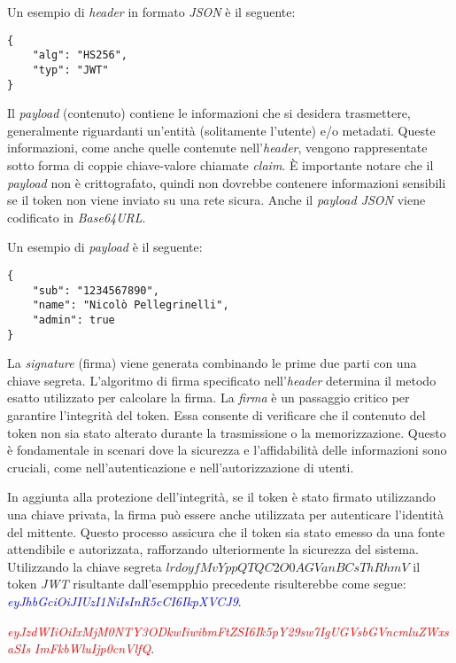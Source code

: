 \noindent Un esempio di \emph{header} in formato \emph{JSON} è il seguente:
\begin{verbatim}
{
	"alg": "HS256",
	"typ": "JWT"
}
\end{verbatim}

Il \emph{payload} (contenuto) contiene le informazioni che si desidera trasmettere, generalmente riguardanti un'entità (solitamente l'utente) e/o metadati.
Queste informazioni, come anche quelle contenute nell'\emph{header}, vengono rappresentate sotto forma di coppie chiave-valore chiamate \emph{claim}.
È importante notare che il \emph{payload} non è crittografato, quindi non dovrebbe contenere informazioni sensibili se il token non viene inviato su una rete sicura.
Anche il \emph{payload JSON} viene codificato in \emph{Base64URL}.

\noindent Un esempio di \emph{payload} è il seguente:
\begin{verbatim}
{
	"sub": "1234567890",
	"name": "Nicolò Pellegrinelli",
	"admin": true
}
\end{verbatim}

La \emph{signature} (firma) viene generata combinando le prime due parti con una chiave segreta.
L'algoritmo di firma specificato nell'\emph{header} determina il metodo esatto utilizzato per calcolare la firma.
La \emph{firma} è un passaggio critico per garantire l'integrità del token.
Essa consente di verificare che il contenuto del token non sia stato alterato durante la trasmissione o la memorizzazione.
Questo è fondamentale in scenari dove la sicurezza e l'affidabilità delle informazioni sono cruciali, come nell'autenticazione e nell'autorizzazione di utenti.

In aggiunta alla protezione dell'integrità, se il token è stato firmato utilizzando una chiave privata, la firma può essere anche utilizzata per autenticare l'identità del mittente.
Questo processo assicura che il token sia stato emesso da una fonte attendibile e autorizzata, rafforzando ulteriormente la sicurezza del sistema.\\

Utilizzando la chiave segreta $lrdoyfMvYppQTQC2O0AGVanBCsThRhmV$ il token \emph{JWT} risultante dall'esempphio precedente risulterebbe come segue: \\


\noindent \emph{\textcolor{blue}{eyJhbGciOiJIUzI1NiIsInR5cCI6IkpXVCJ9}}.

\noindent \emph{\textcolor{red}{eyJzdWIiOiIxMjM0NTY3ODkwIiwibmFtZSI6Ik5pY29sw7IgUGVsbGVncmluZWxsaSIs}}
\noindent \emph{\textcolor{red}{ImFkbWluIjp0cnVlfQ}}.

